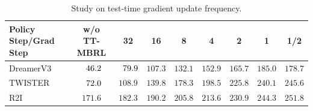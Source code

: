 \begin{table}[ht]
    \caption{Study on test-time gradient update frequency.}
    \centering
    \setlength{\tabcolsep}{4pt}
    \hfill \break
    \begin{tabular}{lcccccccc}
    \toprule
    \textbf{Policy Step/Grad Step} & \textbf{w/o TT-MBRL} & \textbf{32} & \textbf{16} & \textbf{8} & \textbf{4} & \textbf{2} & \textbf{1}  & \textbf{1/2} \\
    \midrule
    DreamerV3 & $\hphantom{0}46.2$ & $\hphantom{0}79.9$ & $107.3$ & $132.1$ & $152.9$ & $165.7$ & $\mathbf{185.0}$ & $178.7$ \\
    TWISTER & $\hphantom{0}72.0$ & $108.9$ & $139.8$ & $178.3$ & $198.5$ & $225.8$ & $240.1$ & $\mathbf{245.6}$ \\
    R2I & $171.6$ & $182.3$ & $190.2$ & $205.8$ & $213.6$ & $230.9$ & $244.3$ & $\mathbf{251.8}$ \\
    \bottomrule
    \end{tabular}
    \label{table:study_frequency}
\end{table}